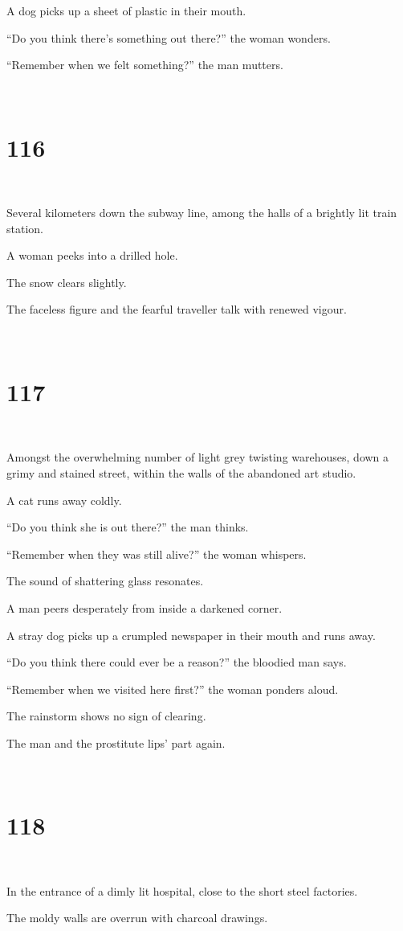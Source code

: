 \documentclass{report}
\begin{document}
A dog picks up a sheet of plastic in their mouth.

``Do you think there's something out there?'' the woman wonders.

``Remember when we felt something?'' the man mutters.

~
\chapter*{116}
~

Several kilometers down the subway line, among the halls of a brightly lit train station.

A woman peeks into a drilled hole.

The snow clears slightly.

The faceless figure and the fearful traveller talk with renewed vigour.

~
\chapter*{117}
~

Amongst the overwhelming number of light grey twisting warehouses, down a grimy and stained street, within the walls of the abandoned art studio.

A cat runs away coldly.

``Do you think she is out there?'' the man thinks.

``Remember when they was still alive?'' the woman whispers.

The sound of shattering glass resonates.

A man peers desperately from inside a darkened corner.

A stray dog picks up a crumpled newspaper in their mouth and runs away.

``Do you think there could ever be a reason?'' the bloodied man says.

``Remember when we visited here first?'' the woman ponders aloud.

The rainstorm shows no sign of clearing.

The man and the prostitute lips' part again.

~
\chapter*{118}
~

In the entrance of a dimly lit hospital, close to the short steel factories.

The moldy walls are overrun with charcoal drawings.
\end{document}
